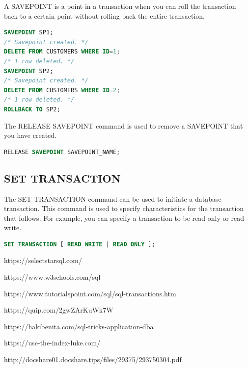 \documentclass{article}
\begin{document}
A SAVEPOINT is a point in a transaction when you can roll the transaction back to a certain point without rolling back the entire transaction.

\vspace{8pt} \begin{lstlisting}[language=SQL]
SAVEPOINT SP1;
/* Savepoint created. */
DELETE FROM CUSTOMERS WHERE ID=1;
/* 1 row deleted. */
SAVEPOINT SP2;
/* Savepoint created. */
DELETE FROM CUSTOMERS WHERE ID=2;
/* 1 row deleted. */
ROLLBACK TO SP2;
\end{lstlisting} \vspace{8pt}

The RELEASE SAVEPOINT command is used to remove a SAVEPOINT that you have created.

\vspace{8pt} \begin{lstlisting}[language=SQL]
RELEASE SAVEPOINT SAVEPOINT_NAME;
\end{lstlisting} \vspace{8pt}


\subsection{SET TRANSACTION}

The SET TRANSACTION command can be used to initiate a database transaction. This command is used to specify characteristics for the transaction that follows. For example, you can specify a transaction to be read only or read write.

\vspace{8pt} \begin{lstlisting}[language=SQL]
SET TRANSACTION [ READ WRITE | READ ONLY ];
\end{lstlisting} \vspace{8pt}




\begin{thebibliography}{}

\bibitem[]{}
https://selectstarsql.com/

\bibitem[]{}
https://www.w3schools.com/sql

\bibitem[]{}
https://www.tutorialspoint.com/sql/sql-transactions.htm

\bibitem[]{}
https://quip.com/2gwZArKuWk7W

\bibitem[]{}
https://hakibenita.com/sql-tricks-application-dba

\bibitem[]{}
https://use-the-index-luke.com/

http://docshare01.docshare.tips/files/29375/293750304.pdf

\end{thebibliography}
\end{document}
